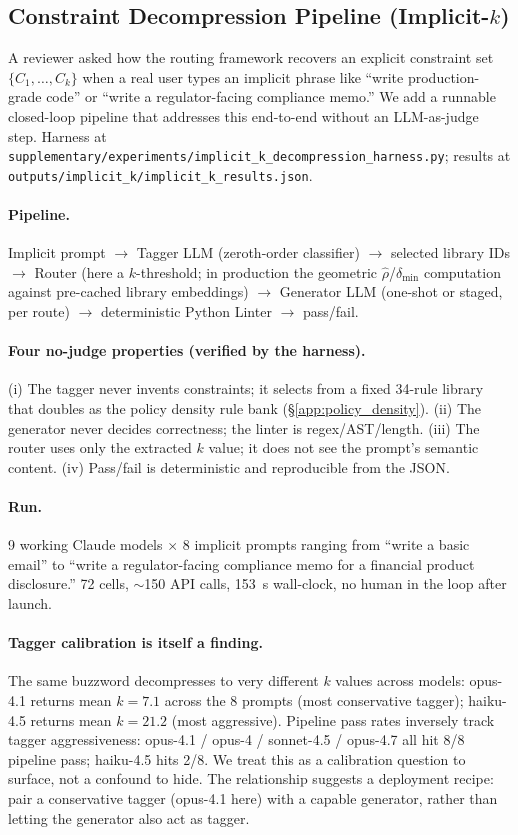 \documentclass{article}
\theoremstyle{plain}
\theoremstyle{definition}
\theoremstyle{remark}
\begin{document}
\subsection{Constraint Decompression Pipeline (Implicit-$k$)}\label{app:implicit_k}

A reviewer asked how the routing framework recovers an explicit constraint set $\{C_1, \ldots, C_k\}$ when a real user types an implicit phrase like ``write production-grade code'' or ``write a regulator-facing compliance memo.'' We add a runnable closed-loop pipeline that addresses this end-to-end without an LLM-as-judge step. Harness at \texttt{supplementary/experiments/implicit\_k\_decompression\_harness.py}; results at \texttt{outputs/implicit\_k/implicit\_k\_results.json}.

\paragraph{Pipeline.} Implicit prompt $\to$ Tagger LLM (zeroth-order classifier) $\to$ selected library IDs $\to$ Router (here a $k$-threshold; in production the geometric $\hat\rho$/$\delta_{\min}$ computation against pre-cached library embeddings) $\to$ Generator LLM (one-shot or staged, per route) $\to$ deterministic Python Linter $\to$ pass/fail.

\paragraph{Four no-judge properties (verified by the harness).} (i) The tagger never invents constraints; it selects from a fixed 34-rule library that doubles as the policy density rule bank (\S\ref{app:policy_density}). (ii) The generator never decides correctness; the linter is regex/AST/length. (iii) The router uses only the extracted $k$ value; it does not see the prompt's semantic content. (iv) Pass/fail is deterministic and reproducible from the JSON.

\paragraph{Run.} 9 working Claude models $\times$ 8 implicit prompts ranging from ``write a basic email'' to ``write a regulator-facing compliance memo for a financial product disclosure.'' 72 cells, $\sim$150 API calls, 153~s wall-clock, no human in the loop after launch.

\paragraph{Tagger calibration is itself a finding.} The same buzzword decompresses to very different $k$ values across models: opus-4.1 returns mean $k{=}7.1$ across the 8 prompts (most conservative tagger); haiku-4.5 returns mean $k{=}21.2$ (most aggressive). Pipeline pass rates inversely track tagger aggressiveness: opus-4.1 / opus-4 / sonnet-4.5 / opus-4.7 all hit 8/8 pipeline pass; haiku-4.5 hits 2/8. We treat this as a calibration question to surface, not a confound to hide. The relationship suggests a deployment recipe: pair a conservative tagger (opus-4.1 here) with a capable generator, rather than letting the generator also act as tagger.
\end{document}
